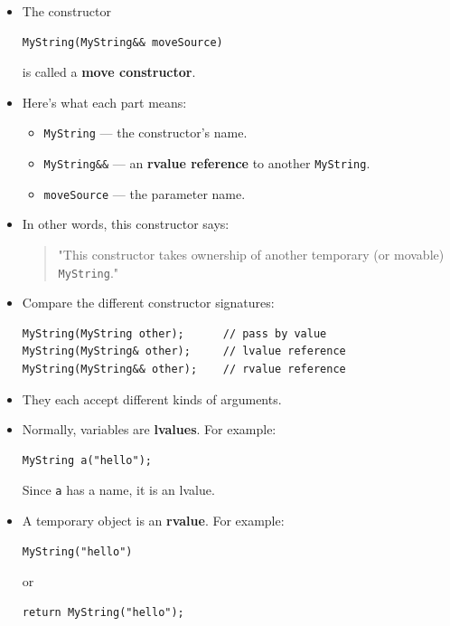 \documentclass[10pt]{article}
\begin{document}
\begin{itemize}
\begin{itemize}
    \item The constructor
\begin{verbatim}
MyString(MyString&& moveSource)
\end{verbatim}
is called a \textbf{move constructor}.

    \item Here's what each part means:
    \begin{itemize}
        \item \verb|MyString| --- the constructor's name.
        \item \verb|MyString&&| --- an \textbf{rvalue reference} to another \verb|MyString|.
        \item \verb|moveSource| --- the parameter name.
    \end{itemize}

    \item In other words, this constructor says:
    \begin{quote}
    "This constructor takes ownership of another temporary (or movable) \verb|MyString|."
    \end{quote}

    \item Compare the different constructor signatures:
\begin{verbatim}
MyString(MyString other);      // pass by value
MyString(MyString& other);     // lvalue reference
MyString(MyString&& other);    // rvalue reference
\end{verbatim}

    \item They each accept different kinds of arguments.

    \item Normally, variables are \textbf{lvalues}. For example:
\begin{verbatim}
MyString a("hello");
\end{verbatim}

    Since \verb|a| has a name, it is an lvalue.

    \item A temporary object is an \textbf{rvalue}. For example:
\begin{verbatim}
MyString("hello")
\end{verbatim}

    or
\begin{verbatim}
return MyString("hello");
\end{verbatim}


\end{itemize}
\end{itemize}
\end{document}
